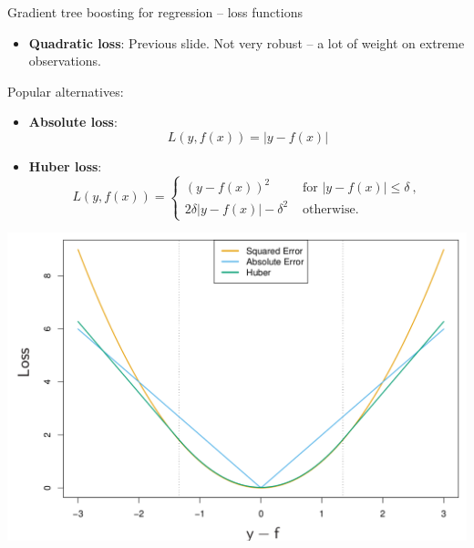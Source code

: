 \documentclass[
  10pt,
  ignorenonframetext,
]{beamer}
\providecommand{\tightlist}{%
  \setlength{\itemsep}{0pt}\setlength{\parskip}{0pt}}
\begin{document}
\begin{frame}
\begin{block}{Gradient tree boosting for regression -- loss functions}
\label{gradient-tree-boosting-for-regression-loss-functions}
\(~\)

\begin{itemize}
\tightlist
\item
  \textbf{Quadratic loss}: Previous slide. Not very robust -- a lot of
  weight on extreme observations.
\end{itemize}

\vspace{8mm}

Popular alternatives:

\vspace{2mm}

\begin{itemize}
\tightlist
\item
  \textbf{Absolute loss}: \[L(y,f(x)) = |y-f(x)| \]
\end{itemize}

\vspace{2mm}

\begin{itemize}
\tightlist
\item
  \textbf{Huber loss}: \[L(y,f(x)) = \begin{cases}
   (y-f(x))^2 &  \text{ for }  |y-f(x)|\leq \delta \ ,\\
  2\delta |y-f(x)| -\delta^2 &  \text{ otherwise.} 
  \end{cases}
  \]
\end{itemize}
\end{block}
\end{frame}

\begin{frame}
\includegraphics{graphics/robust_loss.png}
\end{frame}
\end{document}
